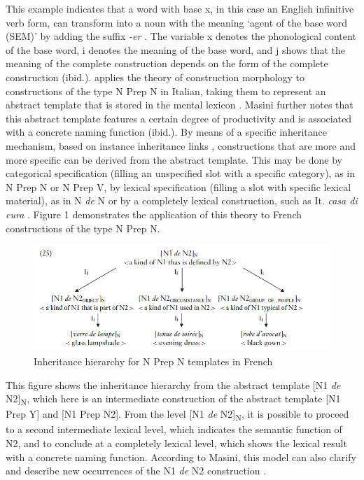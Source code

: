 \documentclass[output=paper]{langsci/langscibook}
\begin{document}
This example indicates that a word with base x, in this case an English infinitive verb form, can transform into a noun with the meaning `agent of the base word (SEM)' by adding the suffix \textit{-er} \citep[2]{Booij:2015}. The variable x denotes the phonological content of the base word, i denotes the meaning of the base word, and j shows that the meaning of the complete construction depends on the form of the complete construction (ibid.). \citet{Masini:2009} applies the theory of construction morphology to constructions of the type N Prep N in Italian, taking them to represent an abstract template that is stored in the mental lexicon \citep[261]{Masini:2009}. Masini further notes that this abstract template features a certain degree of productivity and is associated with a concrete naming function (ibid.). By means of a specific inheritance mechanism, based on instance inheritance links \citep{Goldberg:1995}, constructions that are more and more specific can be derived from the abstract template. This may be done by categorical specification (filling an unspecified slot with a specific category), as in N Prep N or N Prep V, by lexical specification (filling a slot with specific lexical material), as in N \textit{de} N or by a completely lexical construction, such as It. \textit{casa di cura} \citep[261]{Masini:2009}. Figure 1 demonstrates the application of this theory to French constructions of the type N Prep N.

\begin{figure}
\caption{Inheritance hierarchy for N Prep N templates in French \citep[263]{Masini:2009} }
\includegraphics[scale=0.5]{figures/Masinifigure2.png} 
\end{figure}

This figure shows the inheritance hierarchy from the abstract template [N1 \textit{de} N2]\textsubscript{N}, which here is an intermediate construction of the abstract template [N1 Prep Y] and [N1 Prep N2]. From the level [N1 \textit{de} N2]\textsubscript{N}, it is possible to proceed to a second intermediate lexical level, which indicates the semantic function of N2, and to conclude at a completely lexical level, which shows the lexical result with a concrete naming function. According to Masini, this model can also clarify and describe new occurrences of the N1 \textit{de} N2 construction \citep[263]{Masini:2009}. 
\end{document}
